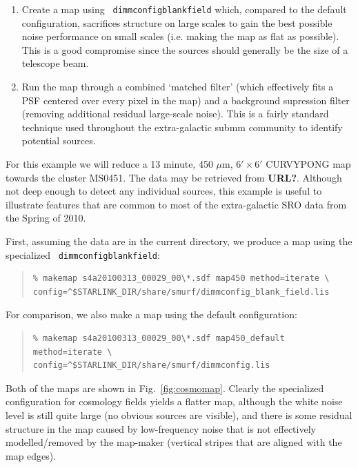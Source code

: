 \documentclass[twoside,11pt]{article}
\newcommand{\micron}{\mbox{\,${\mu}$m}}            %
\renewcommand{\_}{\texttt{\symbol{95}}}
\newenvironment{myquote}{\begin{quote}\begin{small}}{\end{small}\end{quote}}
\begin{document}
\begin{enumerate}

\item Create a map using \texttt{ dimmconfig\_blank\_field} which,
  compared to the default configuration, sacrifices structure on large
  scales to gain the best possible noise performance on small scales
  (i.e. making the map as flat as possible). This is a good compromise
  since the sources should generally be the size of a telescope beam.

\item Run the map through a combined `matched filter' (which
  effectively fits a PSF centered over every pixel in the map) and a
  background supression filter (removing additional residual
  large-scale noise). This is a fairly standard technique used
  throughout the extra-galactic submm community to identify potential
  sources.

\end{enumerate}

For this example we will reduce a 13 minute, 450\,\micron, $6' \times
6'$ CURVY\_PONG map towards the cluster MS0451. The data may be
retrieved from {\bf URL?}. Although not deep enough to detect any
individual sources, this example is useful to illustrate features that
are common to most of the extra-galactic SRO data from the Spring of
2010.

First, assuming the data are in the current directory, we produce a map
using the specialized \texttt{ dimmconfig\_blank\_field}:

\begin{myquote}
\begin{verbatim}
% makemap s4a20100313_00029_00\*.sdf map450 method=iterate \
config=^$STARLINK_DIR/share/smurf/dimmconfig_blank_field.lis
\end{verbatim}
\end{myquote}

For comparison, we also make a map using the default configuration:

\begin{myquote}
\begin{verbatim}
% makemap s4a20100313_00029_00\*.sdf map450_default method=iterate \
config=^$STARLINK_DIR/share/smurf/dimmconfig.lis
\end{verbatim}
\end{myquote}

Both of the maps are shown in Fig.~\ref{fig:cosmomap}. Clearly the
specialized configuration for cosmology fields yields a flatter map,
although the white noise level is still quite large (no obvious
sources are visible), and there is some residual structure in the map
caused by low-frequency noise that is not effectively modelled/removed
by the map-maker (vertical stripes that are aligned with the map
edges).
\end{document}
